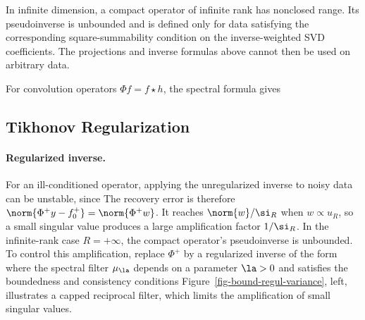 In infinite dimension, a compact operator of infinite rank has nonclosed range. Its pseudoinverse is unbounded and is defined only for data satisfying the corresponding square-summability condition on the inverse-weighted SVD coefficients. The projections and inverse formulas above cannot then be used on arbitrary data.

For convolution operators $\Phi f = f\star h$, the spectral formula gives




\subsection{Tikhonov Regularization}
\label{sec-tikhonov}

\paragraph{Regularized inverse.}

For an ill-conditioned operator, applying the unregularized inverse to noisy data can be unstable, since
The recovery error is therefore $\norm{\Phi^+ y -f_0^+} = \norm{\Phi^+ w}$. It reaches $\norm{w}/\si_R$ when $w \propto u_R$, so a small singular value produces a large amplification factor $1/\si_R$. In the infinite-rank case $R=+\infty$, the compact operator's pseudoinverse is unbounded. To control this amplification, replace $\Phi^+$ by a regularized inverse of the form
where the spectral filter $\mu_\la$ depends on a parameter $\la>0$ and satisfies the boundedness and consistency conditions
Figure~\ref{fig-bound-regul-variance}, left, illustrates a capped reciprocal filter, which limits the amplification of small singular values.


